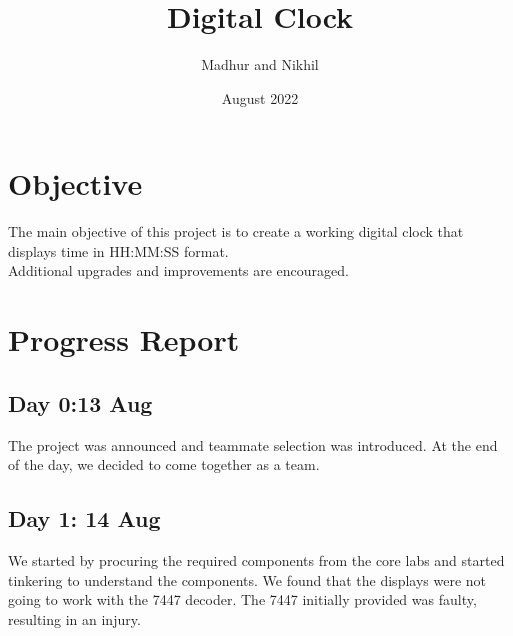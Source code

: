 \documentclass{report}
\title{Digital Clock}
\author{Madhur and Nikhil}
\date{August 2022}
\begin{document}
\pagestyle{fancy}

\fancyhf{} %
\maketitle

\section{Objective}
The main objective of this project is to create a working digital clock that displays time in HH:MM:SS format.\vspace{1cm}\\ Additional upgrades and improvements are encouraged.
\newpage
\section{Progress Report}
\subsection{Day 0:13 Aug}
The project was announced and teammate selection was introduced. At the end of the day, we decided to come together as a team.\\
\subsection {Day 1: 14 Aug}
We started by procuring the required components from the core labs and started tinkering to understand the components. We found that the displays were not going to work with the 7447 decoder. The 7447 initially provided was faulty, resulting in an injury.
\end{document}
